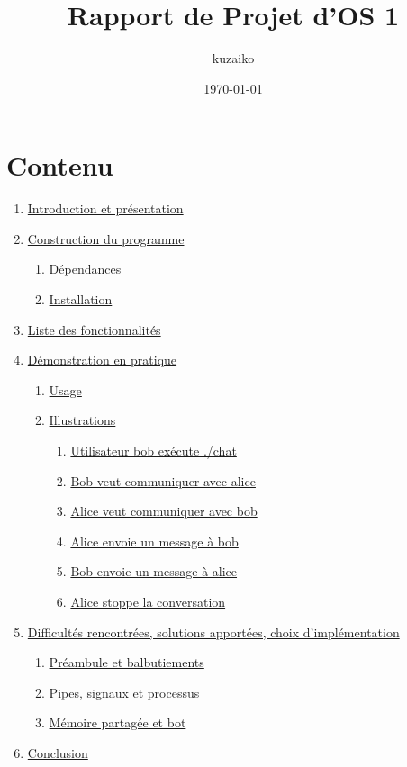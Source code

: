 \documentclass{article}
\title{Rapport de Projet d'OS 1}
\author{kuzaiko}
\date{\today}
\begin{document}
\maketitle


\section{Contenu}
\label{rapport}

\begin{enumerate}
    \item \hyperref[introduction-et-presentation]{Introduction et présentation}
    \item \hyperref[construction-du-programme]{Construction du programme}
    \begin{enumerate}[label*=\arabic*.]
        \item \hyperref[Dépendances]{Dépendances}
        \item \hyperref[Installation]{Installation}
    \end{enumerate}
    \item \hyperref[liste-des-fonctionnalites]{Liste des fonctionnalités}
    \item \hyperref[demonstration-en-pratique]{Démonstration en pratique}
    \begin{enumerate}[label*=\arabic*.]
        \item \hyperref[usage]{Usage}
        \item \hyperref[illustrations]{Illustrations}
        \begin{enumerate}
            \item \hyperref[fig:1]{Utilisateur bob exécute ./chat}
            \item \hyperref[fig:2]{Bob veut communiquer avec alice}
            \item \hyperref[fig:3]{Alice veut communiquer avec bob}
            \item \hyperref[fig:4]{Alice envoie un message à bob}
            \item \hyperref[fig:5]{Bob envoie un message à alice}
            \item \hyperref[fig:6]{Alice stoppe la conversation}
        \end{enumerate}
    \end{enumerate} 
    \item \hyperref[difficultes-rencontrees-solutions-apportees-choix-dimplementation]{Difficultés rencontrées, solutions apportées, choix d'implémentation}
    \begin{enumerate}[label*=\arabic*.]
        \item \hyperref[preambule-et-balbutiements]{Préambule et balbutiements}
        \item \hyperref[pipes-signaux-et-processus]{Pipes, signaux et processus}
        \item \hyperref[memoire-partagee-et-bot]{Mémoire partagée et bot}
    \end{enumerate}
    \item \hyperref[conclusion]{Conclusion}
\end{enumerate}
\end{document}
